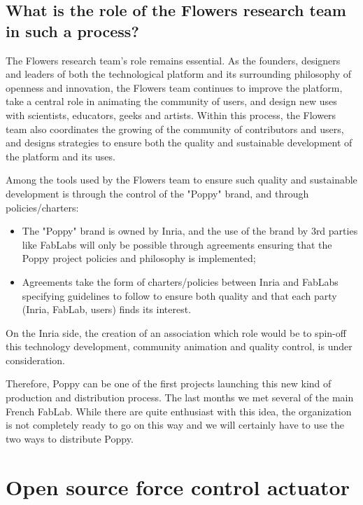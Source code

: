 \subsection{What is the role of the Flowers research team in such a process? } %

The Flowers research team's role remains essential. As the founders, designers and leaders of both the technological platform and its surrounding philosophy of openness and innovation, the Flowers team continues to improve the platform, take a central role in animating the community of users, and design new uses with scientists, educators, geeks and artists. Within this process, the Flowers team also coordinates the growing of the community of contributors and users, and designs strategies to ensure both the quality and sustainable development of the platform and its uses.

Among the tools used by the Flowers team to ensure such quality and sustainable development is through the control of the "Poppy" brand, and through policies/charters:

\begin{itemize}
\item The "Poppy" brand is owned by Inria, and the use of the brand by 3rd parties like FabLabs will only be possible through agreements ensuring that the Poppy project policies and philosophy is implemented;
\item Agreements take the form of charters/policies between Inria and FabLabs specifying guidelines to follow to ensure both quality and that each party (Inria, FabLab, users) finds its interest.
\end{itemize}

On the Inria side, the creation of an association which role would be to spin-off this technology development, community animation and quality control, is under consideration.



Therefore, Poppy can be one of the first projects launching this new kind of production and distribution process. The last months we met several of the main French FabLab. While there are quite enthusiast with this idea, the organization is not completely ready to go on this way and we will certainly have to use the two ways to distribute Poppy.



\section{Open source force control actuator} %
\label{sec:open_sourcing_the_robotic_actuations}


